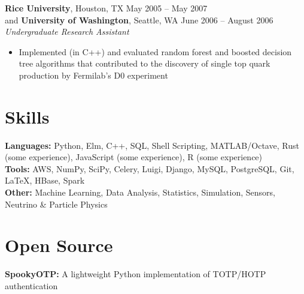 \documentclass[margin,line]{resume}
\begin{document}
\begin{resume}
    \textbf{Rice University}, Houston, TX \hfill May 2005 -- May 2007 \vspace{1mm}\\\vspace{1mm}%
    and \textbf{University of Washington}, Seattle, WA \hfill June 2006 -- August 2006 \vspace{1mm}\\\vspace{1mm}%
    \textsl{Undergraduate Research Assistant}
    \begin{itemize}
    \item Implemented (in C++) and evaluated random forest and boosted decision tree algorithms that contributed to the discovery of single top quark production by Fermilab's D0 experiment
    \end{itemize}
    
    \section{\mysidestyle Skills}\vspace{0mm}%
    \textbf{Languages:} Python, Elm, C++, SQL, Shell Scripting, MATLAB/Octave, Rust (some experience), JavaScript (some experience), R (some experience)
    \vspace{1mm}\\\vspace{0mm}%
    \textbf{Tools:} AWS, NumPy, SciPy, Celery, Luigi, Django, MySQL, PostgreSQL, Git, \LaTeX, HBase, Spark
    \vspace{1mm}\\\vspace{0mm}%
    \textbf{Other:} Machine Learning, Data Analysis, Statistics, Simulation, Sensors, Neutrino \& Particle Physics

    \section{\mysidestyle Open Source}\vspace{0mm}%
    \textbf{SpookyOTP:} A lightweight Python implementation of TOTP/HOTP authentication
    \vspace{1mm}%
    

\end{resume}
\end{document}
